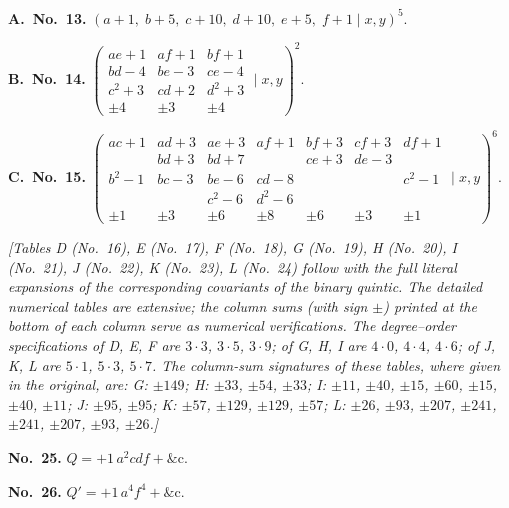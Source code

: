 \documentclass[11pt]{article}
\begin{document}
\medskip
\noindent\textbf{A.\ No.~13.} \quad $(a+1,\; b+5,\; c+10,\; d+10,\; e+5,\; f+1 \mid x, y)^5$.

\medskip
\noindent\textbf{B.\ No.~14.} \quad
$\left(\begin{array}{ccc}
ae + 1 & af + 1 & bf + 1 \\
bd - 4 & be - 3 & ce - 4 \\
c^2 + 3 & cd + 2 & d^2 + 3 \\
\pm 4 & \pm 3 & \pm 4
\end{array} \mid x, y\right)^2$.

\medskip
\noindent\textbf{C.\ No.~15.} \quad
$\left(\begin{array}{ccccccc}
ac + 1 & ad + 3 & ae + 3 & af + 1 & bf + 3 & cf + 3 & df + 1 \\
       & bd + 3 & bd + 7 &        & ce + 3 & de - 3 &        \\
b^2 - 1 & bc - 3 & be - 6 & cd - 8 &       &        & c^2 - 1 \\
        &        & c^2 - 6 & d^2 - 6 &     &        &         \\
\pm 1 & \pm 3 & \pm 6 & \pm 8 & \pm 6 & \pm 3 & \pm 1
\end{array} \mid x, y\right)^6$.

\medskip
\noindent\textit{[Tables D (No.~16), E (No.~17), F (No.~18), G (No.~19), H (No.~20), I (No.~21), J (No.~22), K (No.~23), L (No.~24) follow with the full literal expansions of the corresponding covariants of the binary quintic. The detailed numerical tables are extensive; the column sums (with sign $\pm$) printed at the bottom of each column serve as numerical verifications. The degree--order specifications of D, E, F are $3 \cdot 3$, $3 \cdot 5$, $3 \cdot 9$; of G, H, I are $4 \cdot 0$, $4 \cdot 4$, $4 \cdot 6$; of J, K, L are $5 \cdot 1$, $5 \cdot 3$, $5 \cdot 7$. The column-sum signatures of these tables, where given in the original, are: G: $\pm 149$; H: $\pm 33$, $\pm 54$, $\pm 33$; I: $\pm 11$, $\pm 40$, $\pm 15$, $\pm 60$, $\pm 15$, $\pm 40$, $\pm 11$; J: $\pm 95$, $\pm 95$; K: $\pm 57$, $\pm 129$, $\pm 129$, $\pm 57$; L: $\pm 26$, $\pm 93$, $\pm 207$, $\pm 241$, $\pm 241$, $\pm 207$, $\pm 93$, $\pm 26$.]}

\medskip
\noindent\textbf{No.~25.} \quad $Q = +1\,a^2 c d f + \&\text{c.}$ 

\medskip
\noindent\textbf{No.~26.} \quad $Q' = +1\,a^4 f^4 + \&\text{c.}$

\end{document}
